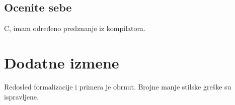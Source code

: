 \documentclass[a4paper]{report}
\begin{document}
\section{Ocenite sebe}

C, imam određeno predznanje iz kompilatora.

\chapter{Dodatne izmene}
Redosled formalizacije i primera je obrnut. Brojne manje stilske greške su ispravljene.
\end{document}
